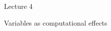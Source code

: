 \documentclass[10pt]{beamer}
\begin{document}


\begin{frame}
  \begin{center}
    \Huge Lecture 4

    \bigskip

    \Large
    Variables as computational effects
  \end{center}
\end{frame}

\end{document}
